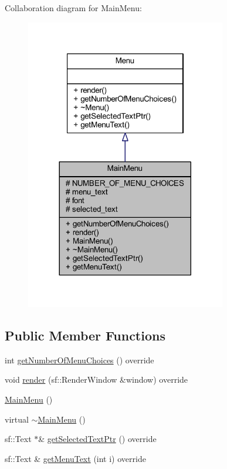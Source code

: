 Collaboration diagram for Main\+Menu\+:\nopagebreak
\begin{figure}[H]
\begin{center}
\leavevmode
\includegraphics[width=248pt]{class_main_menu__coll__graph}
\end{center}
\end{figure}
\subsection*{Public Member Functions}
\begin{DoxyCompactItemize}
\item 
int \hyperlink{class_main_menu_aec279c06705f829ab154b9023ec838b3}{get\+Number\+Of\+Menu\+Choices} () override
\item 
void \hyperlink{class_main_menu_a1487a843dd8cf56374afa60a5b62e9bf}{render} (sf\+::\+Render\+Window \&window) override
\item 
\hyperlink{class_main_menu_a53eecf9d5ffd094f54ac4193e7e57eaf}{Main\+Menu} ()
\item 
virtual \hyperlink{class_main_menu_a0a19ddba3ac52bf39c09b579171c98f2}{$\sim$\+Main\+Menu} ()
\item 
sf\+::\+Text $\ast$\& \hyperlink{class_main_menu_abdf7a2a5bca4e2916bf9dc218c0de96f}{get\+Selected\+Text\+Ptr} () override
\item 
sf\+::\+Text \& \hyperlink{class_main_menu_ac5be2a5b81d51c79dfeab061263e00ba}{get\+Menu\+Text} (int i) override
\end{DoxyCompactItemize}
